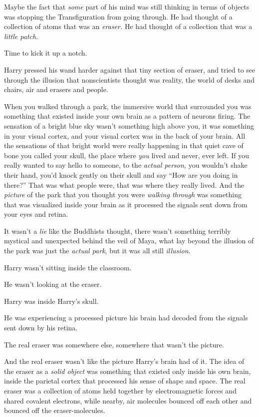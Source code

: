 Maybe the fact that \emph{some} part of his mind was still thinking in
terms of objects was stopping the Transfiguration from going through. He
had thought of a collection of atoms that was an \emph{eraser.} He had
thought of a collection that was a \emph{little patch.}

Time to kick it up a notch.

Harry pressed his wand harder against that tiny section of eraser, and
tried to see through the illusion that nonscientists thought was
reality, the world of desks and chairs, air and erasers and people.

When you walked through a park, the immersive world that surrounded you
was something that existed inside your own brain as a pattern of neurons
firing. The sensation of a bright blue sky wasn't something high above
you, it was something in your visual cortex, and your visual cortex was
in the back of your brain. All the sensations of that bright world were
really happening in that quiet cave of bone you called your skull, the
place where \emph{you} lived and never, ever left. If you really wanted
to say hello to someone, to the \emph{actual person,} you wouldn't shake
their hand, you'd knock gently on their skull and say ``How are you
doing in there?'' That was what people were, that was where they really
lived. And the \emph{picture} of the park that you thought you were
\emph{walking through} was something that was visualized inside your
brain as it processed the signals sent down from your eyes and retina.

It wasn't a \emph{lie} like the Buddhists thought, there wasn't
something terribly mystical and unexpected behind the veil of Maya, what
lay beyond the illusion of the park was just the \emph{actual park}, but
it was all still \emph{illusion}.

Harry wasn't sitting inside the classroom.

He wasn't looking at the eraser.

Harry was inside Harry's skull.

He was experiencing a processed picture his brain had decoded from the
signals sent down by his retina.

The real eraser was somewhere else, somewhere that wasn't the picture.

And the real eraser wasn't like the picture Harry's brain had of it. The
idea of the eraser as a \emph{solid object} was something that existed
only inside his own brain, inside the parietal cortex that processed his
sense of shape and space. The real eraser was a collection of atoms held
together by electromagnetic forces and shared covalent electrons, while
nearby, air molecules bounced off each other and bounced off the
eraser-molecules.

